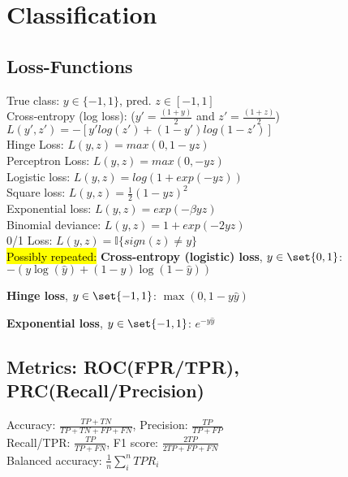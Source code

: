 \section{Classification}
\subsection*{Loss-Functions}
True class: $y \in \{-1,1\}$, pred. $z \in [-1,1]$\\
Cross-entropy (log loss): ($y'=\tfrac{(1+y)}{2}$ and $z'=\tfrac{(1+z)}{2}$) $L(y',z') {=} -[y'log(z') {+} (1-y')log(1-z')]$ \\
Hinge Loss: $L(y,z) = max(0, 1-yz)$ \\
Perceptron Loss: $L(y,z) = max(0, -yz)$ \\
Logistic loss: $L(y,z) = log(1 + exp(-yz))$ \\
Square loss: $L(y,z) = \tfrac{1}{2}(1-yz)^2$ \\
Exponential loss: $L(y,z) = exp(-\beta yz)$ \\
Binomial deviance: $L(y,z) = 1 + exp(-2yz)$ \\
0/1 Loss: $L(y,z) = \mathbb{I}\{sign(z)\neq y\}$ \\

\hl{Possibly repeated:} \textbf{Cross-entropy (logistic) loss}, $y \in \set{0, 1}$: $-(y\log(\hat{y}) + (1-y) \log(1-\hat{y}))$

\textbf{Hinge loss}, $y \in \set{-1, 1}$: $\max(0, 1 - y \hat{y})$

\textbf{Exponential loss}, $y \in \set{-1, 1}$: $e^{-y\hat{y}}$



\subsection*{Metrics: ROC(FPR/TPR), PRC(Recall/Precision)}
Accuracy: $\frac{TP+TN}{TP+TN+FP+FN}$, Precision: $\frac{TP}{TP+FP}$\\ Recall/TPR: $\frac{TP}{TP+FN}$, F1 score: $\frac{2TP}{2TP+FP+FN}$\\
Balanced accuracy: $\frac{1}{n}\sum_i^n TPR_i$
